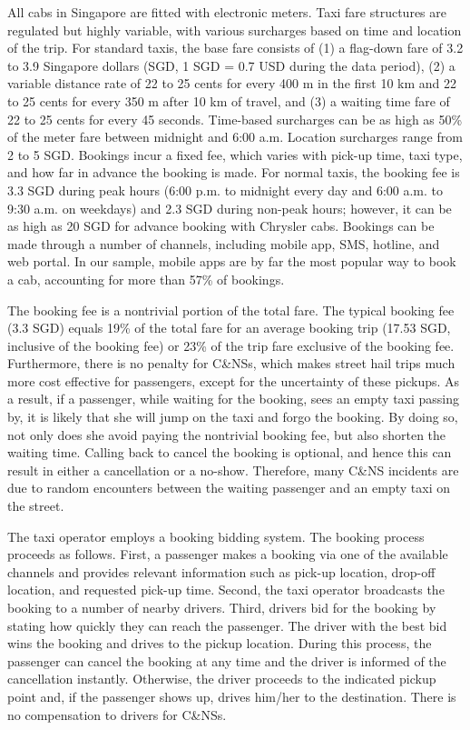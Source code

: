 \documentclass[reviewmode]{AEA}
\begin{document}
All cabs in Singapore are fitted with electronic meters. Taxi fare structures are regulated but highly variable,
with various surcharges based on time and location of the trip. For standard taxis, the base fare consists of (1) a flag-down fare of 3.2 to 3.9 Singapore dollars (SGD, 1 SGD = 0.7 USD during the data period), 
(2) a variable distance rate of 22 to 25 cents for every 400 m in the first 10 km and 22 to 25 cents for every 350 m after 10 km of travel, and (3) a waiting time fare of 22 to 25 cents for every 45 seconds. Time-based surcharges can be as high as 50\% of the meter fare between midnight and 6:00 a.m. Location surcharges range from 2 to 5 SGD. Bookings incur a fixed fee, which varies with pick-up time, taxi type, and how far in advance the booking is made. For normal taxis, the booking fee is 3.3 SGD during peak hours (6:00 p.m. to midnight every day and 6:00 a.m. to 9:30 a.m. on weekdays) and 2.3 SGD during non-peak hours; however, it can be as high as 20 SGD for advance booking with Chrysler cabs. Bookings can be made through a number of channels, including mobile app, SMS, hotline, and web portal. In our sample, mobile apps are by far the most popular way to book a cab, accounting for more than 57\% of bookings.

The booking fee is a nontrivial portion of the total fare. The typical booking fee (3.3 SGD) equals 19\% of the total fare for an average booking trip (17.53 SGD, inclusive of the booking fee) or 23\% of the trip fare exclusive of the booking fee. Furthermore, there is no penalty for C\&NSs, which makes street hail trips much more cost effective for passengers, except for the uncertainty of these pickups. As a result, if a passenger, while waiting for the booking, sees an empty taxi passing by, it is likely that she will jump on the taxi and forgo the booking. By doing so, not only does she avoid paying the nontrivial booking fee, but also shorten the waiting time. Calling back to cancel the booking is optional, and hence this can result in either a cancellation or a no-show. Therefore, many C\&NS incidents are due to random encounters between the waiting passenger and an empty taxi on the street.

The taxi operator employs a booking bidding system. The booking process proceeds as follows. First, a passenger makes a booking via one of the available channels and provides relevant information such as pick-up location, drop-off location, and requested pick-up time. Second, the taxi operator broadcasts the booking to a number of nearby drivers. Third, drivers bid for the booking by stating how quickly they can reach the passenger. The driver with the best bid wins the booking and drives to the pickup location. During this process, the passenger can cancel the booking at any time and the driver is informed of the cancellation instantly. Otherwise, the driver proceeds to the indicated pickup point and, if the passenger shows up, drives him/her to the destination. There is no compensation to drivers for C\&NSs.
\end{document}
